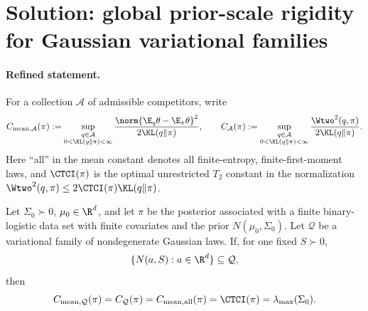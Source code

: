 \documentclass[../main.tex]{subfiles}
\begin{document}

\section*{Solution: global prior-scale rigidity for Gaussian variational families}
\label{sec:sol-prop-a4-logistic-global}

\paragraph{Refined statement.}
For a collection $\mathcal A$ of admissible competitors, write
\[
 C_{\mathrm{mean},\mathcal A}(\pi)
 :=\sup_{\substack{q\in\mathcal A\\0<\KL(q\|\pi)<\infty}}
 \frac{\norm{\E_q\theta-\E_\pi\theta}^2}{2\KL(q\|\pi)},
 \qquad
 C_{\mathcal A}(\pi)
 :=\sup_{\substack{q\in\mathcal A\\0<\KL(q\|\pi)<\infty}}
 \frac{\Wtwo^2(q,\pi)}{2\KL(q\|\pi)}.
\]
Here ``all'' in the mean constant denotes all finite-entropy, finite-first-moment laws, and
$\CTCI(\pi)$ is the optimal unrestricted $T_2$ constant in the normalization
$\Wtwo^2(q,\pi)\le 2\CTCI(\pi)\KL(q\|\pi)$.

\begin{theorem}
\label{thm:sol-prop-a4-logistic-global}
Let $\Sigma_0\succ0$, $\mu_0\in\R^d$, and let $\pi$ be the posterior associated with a finite
binary-logistic data set with finite covariates and the prior $N(\mu_0,\Sigma_0)$.  Let
$\mathcal Q$ be a variational family of nondegenerate Gaussian laws.  If, for one fixed
$S\succ0$,
\[
 \{N(a,S):a\in\R^d\}\subseteq\mathcal Q,
\]
then
\[
 C_{\mathrm{mean},\mathcal Q}(\pi)
 =C_{\mathcal Q}(\pi)
 =C_{\mathrm{mean},\mathrm{all}}(\pi)
 =\CTCI(\pi)
 =\lambda_{\max}(\Sigma_0).
\]
\end{theorem}
\end{document}
